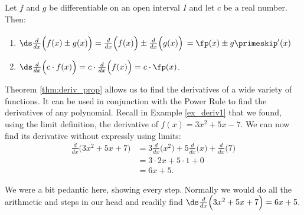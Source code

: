 {Let $f$ and $g$ be differentiable on an open interval $I$ and let $c$ be a real number. Then:
	\begin{enumerate}
	\item	{}
	
	$\ds \frac{d}{dx}\Big(f(x) \pm g(x)\Big) = \frac{d}{dx}\Big(f(x)\Big) \pm \frac{d}{dx}\Big(g(x)\Big)$ $= \rule{0pt}{15pt}\fp(x)\pm g\primeskip'(x)$
	\item		{}
	
	$\ds \frac{d}{dx}\Big(c\cdot f(x)\Big) = c\cdot\frac{d}{dx}\Big(f(x)\Big) = c\cdot\fp(x)$.
	\end{enumerate}
}

Theorem \ref{thm:deriv_prop} allows us to find the derivatives of a wide variety of functions. It can be used in conjunction with the Power Rule to find the derivatives of any polynomial. Recall in Example \ref{ex_deriv1} that we found, using the limit definition, the derivative of $f(x) = 3x^2+5x-7$. We can now find its derivative without expressly using limits:
		\begin{align*}
		\frac{d}{dx}\Big(3x^2+5x+7\Big) &= 3\frac{d}{dx}\Big(x^2\Big) + 5\frac{d}{dx}\Big(x\Big) + \frac{d}{dx}\Big(7\Big) \\
																		&= 3\cdot 2x+5\cdot 1+ 0\\
																		&= 6x+5.
		\end{align*}

We were a bit pedantic here, showing every step. Normally we would do all the arithmetic and steps in our head and readily find $\ds \frac{d}{dx}\Big(3x^2+5x+7\Big) = 6x+5.$\\

